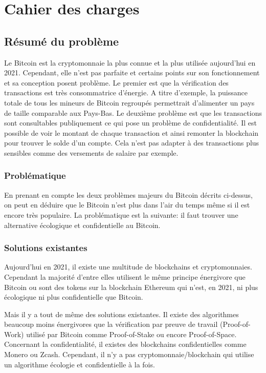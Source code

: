 \chapter{Cahier des charges}



\section*{Résumé du problème}

Le Bitcoin est la cryptomonnaie la plus connue et la plus utilisée aujourd'hui en 2021. Cependant, elle n'est pas parfaite et certains points sur son fonctionnement et sa conception posent problème. Le premier est que la vérification des transactions est très consommatrice d'énergie. A titre d'exemple, la puissance totale de tous les mineurs de Bitcoin regroupés permettrait d'alimenter un pays de taille comparable aux Pays-Bas\cite{BTC_cons}. Le deuxième problème est que les transactions sont consultables publiquement ce qui pose un problème de confidentialité. Il est possible de voir le montant de chaque transaction et ainsi remonter la blockchain pour trouver le solde d'un compte. Cela n'est pas adapter à des transactions plus sensibles comme des versements de salaire par exemple.

\subsection*{Problématique}

En prenant en compte les deux problèmes majeurs du Bitcoin décrits ci-dessus, on peut en déduire que le Bitcoin n'est plus dans l'air du temps même si il est encore très populaire. La problématique est la suivante: il faut trouver une alternative écologique et confidentielle au Bitcoin.

\subsection*{Solutions existantes}

Aujourd'hui en 2021, il existe une multitude de blockchains et cryptomonnaies. Cependant la majorité d'entre elles utilisent le même principe énergivore que Bitcoin ou sont des tokens sur la blockchain Ethereum qui n'est, en 2021, ni plus écologique ni plus confidentielle que Bitcoin.

Mais il y a tout de même des solutions existantes. Il existe des algorithmes beaucoup moins énergivores que la vérification par preuve de travail (Proof-of-Work) utilisé par Bitcoin comme Proof-of-Stake ou encore Proof-of-Space. Concernant la confidentialité, il existes des blockchains confidentielles comme Monero ou Zcash. Cependant, il n'y a pas cryptomonnaie/blockchain qui utilise un algorithme écologie et confidentielle à la fois.

